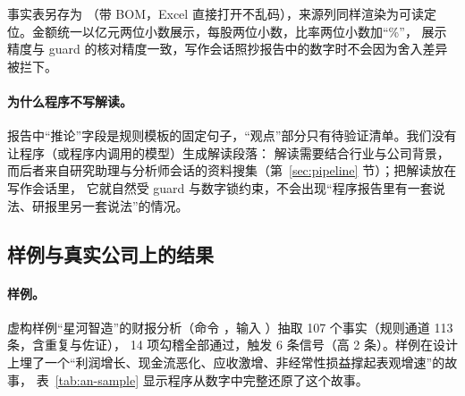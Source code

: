 事实表另存为 （带 BOM，Excel 直接打开不乱码），来源列同样渲染为可读定位。金额统一以亿元两位小数展示，每股两位小数，比率两位小数加“\%”，
展示精度与 guard 的核对精度一致，写作会话照抄报告中的数字时不会因为舍入差异被拦下。

\paragraph{为什么程序不写解读。}
报告中“推论”字段是规则模板的固定句子，“观点”部分只有待验证清单。我们没有让程序（或程序内调用的模型）生成解读段落：
解读需要结合行业与公司背景，而后者来自研究助理与分析师会话的资料搜集（第~\ref{sec:pipeline} 节）；把解读放在写作会话里，
它就自然受 guard 与数字锁约束，不会出现“程序报告里有一套说法、研报里另一套说法”的情况。

\subsection{样例与真实公司上的结果}
\label{sec:an-results}

\paragraph{样例。}
虚构样例“星河智造”的财报分析（命令 ，输入 ）抽取 107 个事实（规则通道 113 条，含重复与佐证），
14 项勾稽全部通过，触发 6 条信号（高 2 条）。样例在设计上埋了一个“利润增长、现金流恶化、应收激增、非经常性损益撑起表观增速”的故事，
表~\ref{tab:an-sample} 显示程序从数字中完整还原了这个故事。

